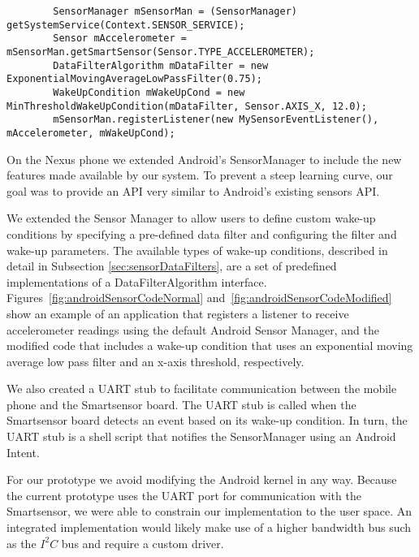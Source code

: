 \begin{figure*}[t]
{\small
	\begin{verbatim}
		SensorManager mSensorMan = (SensorManager) getSystemService(Context.SENSOR_SERVICE);
		Sensor mAccelerometer = mSensorMan.getSmartSensor(Sensor.TYPE_ACCELEROMETER);
		DataFilterAlgorithm mDataFilter = new ExponentialMovingAverageLowPassFilter(0.75);
		WakeUpCondition mWakeUpCond = new MinThresholdWakeUpCondition(mDataFilter, Sensor.AXIS_X, 12.0);
		mSensorMan.registerListener(new MySensorEventListener(), mAccelerometer, mWakeUpCond);
	\end{verbatim}
}
	\caption{Usage of the SensorManager with a wake-up condition}
    \label{fig:androidSensorCodeModified}
\end{figure*}

On the Nexus phone we extended Android's SensorManager to include the
new features made available by our system. To prevent a steep learning
curve, our goal was to provide an API very similar to Android's
existing sensors API.  

We extended the Sensor Manager to allow users to define custom wake-up
conditions by specifying a pre-defined data filter and configuring the
filter and wake-up parameters. The available types of wake-up
conditions, described in detail in Subsection
\ref{sec:sensorDataFilters}, are a set of predefined implementations
of a DataFilterAlgorithm interface.
Figures~\ref{fig:androidSensorCodeNormal}
and~\ref{fig:androidSensorCodeModified} show an example of an
application that registers a listener to receive accelerometer
readings using the default Android Sensor Manager, and the modified
code that includes a wake-up condition that uses an exponential moving
average low pass filter and an x-axis threshold, respectively.

We also created a UART stub to facilitate communication between the
mobile phone and the Smartsensor board. The UART stub is called when
the Smartsensor board detects an event based on its wake-up condition.
In turn, the UART stub is a shell script that notifies the
SensorManager using an Android Intent\cite{androidintents}.

For our prototype we avoid modifying the Android kernel in any way.
Because the current prototype uses the UART port for communication
with the Smartsensor, we were able to constrain our implementation to
the user space. An integrated implementation would likely make use of
a higher bandwidth bus such as the $I^2C$ bus and require a custom
driver.


